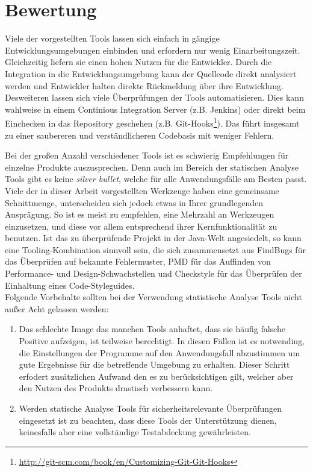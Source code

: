 \section{Bewertung}
Viele der vorgestellten Tools lassen sich einfach in gängige Entwicklungsumgebungen einbinden und erfordern nur wenig Einarbeitungszeit. Gleichzeitig liefern sie einen hohen Nutzen für die Entwickler. 
Durch die Integration in die Entwicklungsumgebung kann der Quellcode direkt analysiert werden und Entwickler halten direkte Rückmeldung über ihre Entwicklung. Desweiteren lassen sich viele Überprüfungen der Tools automatisieren. Dies kann wahlweise in einem Continious Integration Server (z.B. Jenkins) oder direkt beim Einchecken in das Repository geschehen (z.B. Git-Hooks\footnote{\url{http://git-scm.com/book/en/Customizing-Git-Git-Hooks}}). Das führt insgesamt zu einer saubereren und verständlicheren Codebasis mit weniger Fehlern.

Bei der großen Anzahl verschiedener Tools ist es schwierig Empfehlungen für einzelne Produkte auszusprechen. Denn auch im Bereich der statischen Analyse Tools gibt es keine \emph{silver bullet}, welche für alle Anwendungsfälle am Besten passt. Viele der in dieser Arbeit vorgestellten Werkzeuge haben eine gemeinsame Schnittmenge, unterscheiden sich jedoch etwas in Ihrer grundlegenden Ausprägung. So ist es meist zu empfehlen, eine Mehrzahl an Werkzeugen einzusetzen, und diese vor allem entsprechend ihrer Kernfunktionalität zu benutzen.
Ist das zu überprüfende Projekt in der Java-Welt angesiedelt, so kann eine Tooling-Kombination sinnvoll sein, die sich zusammensetzt aus FindBugs für das Überprüfen auf bekannte Fehlermuster, PMD für das Auffinden von Performance- und Design-Schwachstellen und Checkstyle für das Überprüfen der Einhaltung eines Code-Styleguides.\\

Folgende Vorbehalte sollten bei der Verwendung statistische Analyse Tools nicht außer Acht gelassen werden:
\begin{enumerate}
  \item Das schlechte Image das manchen Tools anhaftet, dass sie häufig falsche Positive aufzeigen, ist teilweise berechtigt. In diesen Fällen ist es notwending, die Einstellungen der Programme auf den Anwendungsfall abzustimmen um gute Ergebnisse für die betreffende Umgebung zu erhalten. Dieser Schritt erfodert zusätzlichen Aufwand den es zu berücksichtigen gilt, welcher aber den Nutzen des Produkts drastisch verbessern kann.
  \item Werden statische Analyse Tools für sicherheitsrelevante Überprüfungen eingesetzt ist zu beachten, dass diese Tools der Unterstützung dienen, keinesfalls aber eine vollständige Testabdeckung gewährleisten.
\end{enumerate}

